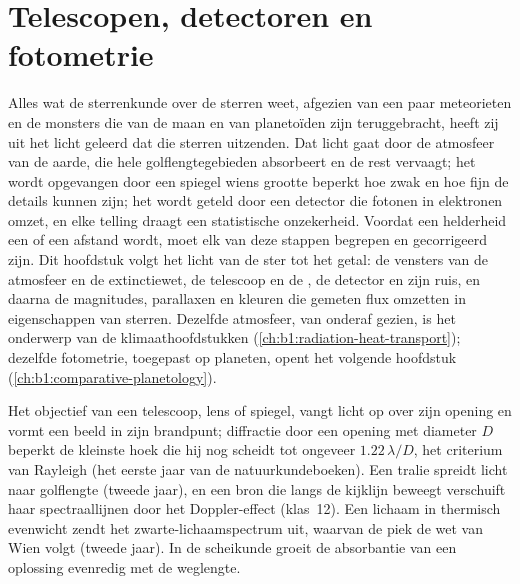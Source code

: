 \chapter{Telescopen, detectoren en fotometrie}\label{ch:b1:observing-the-sky}

Alles wat de sterrenkunde over de sterren weet, afgezien van een paar meteorieten
en de monsters die van de maan en van planetoïden zijn teruggebracht, heeft zij
uit het licht geleerd dat die sterren uitzenden. Dat licht gaat door de
atmosfeer van de aarde, die hele golflengtegebieden absorbeert en de rest
vervaagt; het wordt opgevangen door een spiegel wiens grootte beperkt hoe zwak
en hoe fijn de details kunnen zijn; het wordt geteld door een detector die
fotonen in elektronen omzet, en elke telling draagt een statistische
onzekerheid. Voordat een helderheid een  of een afstand wordt, moet
elk van deze stappen begrepen en gecorrigeerd zijn. Dit hoofdstuk volgt het
licht van de ster tot het getal: de vensters van de atmosfeer en de
extinctiewet, de telescoop en de , de detector en zijn ruis, en daarna de
magnitudes, parallaxen en kleuren die gemeten flux omzetten in eigenschappen
van sterren. Dezelfde atmosfeer, van onderaf gezien, is het onderwerp van de
klimaathoofdstukken (\cref{ch:b1:radiation-heat-transport}); dezelfde fotometrie,
toegepast op planeten, opent het volgende hoofdstuk
(\cref{ch:b1:comparative-planetology}).

\begin{recall}
Het objectief van een telescoop, lens of spiegel, vangt licht op over zijn opening
en vormt een beeld in zijn brandpunt; diffractie door een opening met diameter
$D$ beperkt de kleinste hoek die hij nog scheidt tot ongeveer $1.22\,\lambda/D$,
het criterium van Rayleigh (het eerste jaar van de natuurkundeboeken). Een
tralie spreidt licht naar golflengte (tweede jaar), en een bron die langs de
kijklijn beweegt verschuift haar spectraallijnen door het Doppler-effect (klas~12). Een lichaam in thermisch evenwicht zendt het zwarte-lichaamspectrum uit,
waarvan de piek de wet van Wien volgt (tweede jaar). In de scheikunde groeit de
absorbantie van een oplossing evenredig met de weglengte.
\end{recall}

